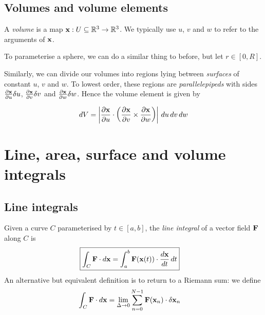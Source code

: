 \documentclass{../template/note}
\begin{document}
    \subsection{Volumes and volume elements}

    \begin{definition*}
        A \emph{volume} is a map \(\V x: U \subseteq \RR^3 \to \RR^3\). We typically use \(u\), \(v\) and \(w\) to refer to the arguments of \(\V x\).
    \end{definition*}
    
    \begin{example*}
        To parameterise a sphere, we can do a similar thing to before, but let \(r \in [0, R]\).
    \end{example*}
    
    Similarly, we can divide our volumes into regions lying between \emph{surfaces} of constant \(u\), \(v\) and \(w\). To lowest order, these regions are \emph{parallelepipeds} with sides \(\pd{\V x}{u} \delta u\), \(\pd{\V x}{v} \delta v\) and \(\pd{\V x}{w} \delta w\). Hence the volume element is given by
    \begin{proposition}
        \label{4.5} \[
            dV = \left|\pd{\V x}{u} \cdot \left(\pd{\V x}{v} \times \pd{\V x}{w}\right)\right| \D u \D v \D w
        \]
    \end{proposition}
    
    \section{Line, area, surface and volume integrals}

    \subsection{Line integrals}

    \begin{definition*}
        Given a curve \(C\) parameterised by \(t \in [a, b]\), the \emph{line integral} of a vector field \(\V F\) along \(C\) is
        \begin{align*}
            \Aboxed{\int_C \V F \cdot d \V x = \int_a^b \V F(\V x(t)) \cdot \frac{d \V x}{dt} \D t}
        \end{align*}
        An alternative but equivalent definition is to return to a Riemann sum: we define
        \begin{align*}
            \int_C \V F \cdot d \V x &= \lim_{\Delta \to 0}\sum_{n=0}^{N-1} \V F(\V x_n) \cdot \delta \V x_n
        \end{align*}
    \end{definition*}
    
\end{document}
